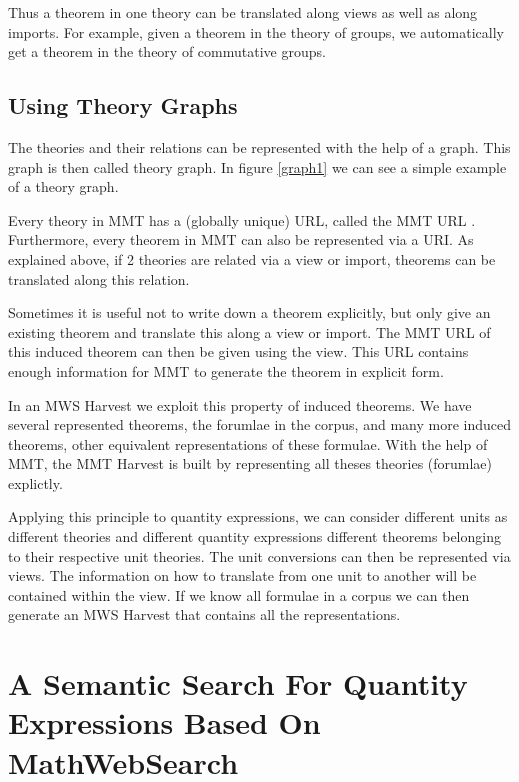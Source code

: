 \documentclass[11pt]{article}
\begin{document}
Thus a theorem in one theory can be translated along views as well as along imports. For example, given a theorem in the theory of groups, we automatically get a theorem in the theory of commutative groups.

\subsection{Using Theory Graphs}
\label{sec:mws:tg}

The theories and their relations can be represented with the help of a graph. This graph is then called theory graph. In figure \ref{graph1} we can see a simple example of a theory graph.



Every theory in MMT has a (globally unique) URL, called the MMT URL . Furthermore, every theorem in MMT can also be represented via a URI. As explained above, if 2 theories are related via a view or import, theorems can be translated along this relation.

Sometimes it is useful not to write down a theorem explicitly, but only give an existing theorem and translate this along a view or import. The MMT URL of this induced theorem can then be given using the view. This URL contains enough information for MMT to generate the theorem in explicit form\cite{IanKohProd:rassmk14}.

In an MWS Harvest we exploit this property of induced theorems. We have several represented theorems, the forumlae in the corpus, and many more induced theorems, other equivalent representations of these formulae. With the help of MMT, the MMT Harvest is built by representing all theses theories (forumlae) explictly.

Applying this principle to quantity expressions, we can consider different units as different theories and different quantity expressions different theorems belonging to their respective unit theories. The unit conversions can then be represented via views. The information on how to translate from one unit to another will be contained within the view. If we know all formulae in a corpus we can then generate an MWS Harvest that contains all the representations. 

\section{A Semantic Search For Quantity Expressions Based On MathWebSearch}
\label{sec:extension}
\end{document}

